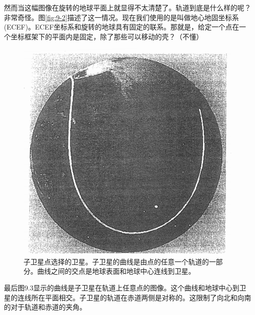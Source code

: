 	然而当这幅图像在旋转的地球平面上就显得不太清楚了。轨道到底是什么样的呢？非常奇怪。图\ref{fig:9-2}描述了这一情况。现在我们使用的是叫做地心地固坐标系(ECEF)。ECEF坐标系和旋转的地球具有固定的联系。那就是，给定一个点在一个坐标框架下的平面内是固定，除了那些可以移动的壳？（不懂）
	\begin{figure}
	\centering
	\includegraphics[width=0.4\linewidth]{TeX_files/Part03/chapter09/image/9-3}
	\caption{子卫星点选择的卫星。子卫星的曲线是由点的任意一个轨道的一部分。曲线之间的交点是地球表面和地球中心连线到卫星。}
	\label{fig:9-3}
	\end{figure}

	最后图9.3显示的曲线是子卫星在轨道上任意点的图像。这个曲线和地球中心到卫星的连线所在平面相交。子卫星的轨道在赤道两侧是对称的。这限制了向北和向南的对于轨道和赤道的夹角。
	\newpage